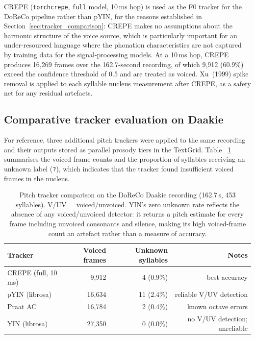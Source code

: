 CREPE (\texttt{torchcrepe}, \texttt{full} model, 10\,ms hop) is used as the
F0 tracker for the DoReCo pipeline rather than pYIN, for the reasons established
in Section~\ref{sec:tracker_comparison}: CREPE makes no assumptions about the
harmonic structure of the voice source, which is particularly important for an
under-resourced language where the phonation characteristics are not captured by
training data for the signal-processing models. At a 10\,ms hop, CREPE produces
16,269 frames over the 162.7-second recording, of which 9,912 (60.9\%) exceed
the confidence threshold of 0.5 and are treated as voiced. Xu~(1999) spike
removal is applied to each syllable nucleus measurement after CREPE, as a safety
net for any residual artefacts.

\subsection{Comparative tracker evaluation on Daakie}

For reference, three additional pitch trackers were applied to the same recording
and their outputs stored as parallel prosody tiers in the TextGrid. Table~%
\ref{tab:daakie_trackers} summarises the voiced frame counts and the proportion
of syllables receiving an unknown label (\texttt{?}), which indicates that the
tracker found insufficient voiced frames in the nucleus.

\begin{table}[h]
\centering
\begin{tabular}{lrrr}
\hline
Tracker & Voiced frames & Unknown syllables & Notes \\
\hline
CREPE (full, 10\,ms)  & 9{,}912  & 4 (0.9\%)  & best accuracy \\
pYIN (librosa)        & 16{,}634 & 11 (2.4\%) & reliable V/UV detection \\
Praat AC              & 16{,}784 & 2 (0.4\%)  & known octave errors \\
YIN (librosa)         & 27{,}350 & 0 (0.0\%)  & no V/UV detection; unreliable \\
\hline
\end{tabular}
\caption{Pitch tracker comparison on the DoReCo Daakie recording (162.7\,s,
453 syllables). V/UV = voiced/unvoiced. YIN's zero unknown rate reflects the
absence of any voiced/unvoiced detector: it returns a pitch estimate for every
frame including unvoiced consonants and silence, making its high voiced-frame
count an artefact rather than a measure of accuracy.}
\label{tab:daakie_trackers}
\end{table}

